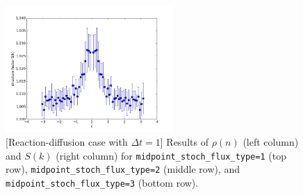 \documentclass{article}
\begin{document}
\begin{figure}
\includegraphics[width=0.5\linewidth,height=1.9in]{fig1/react_dt1_Sk_mid3.jpg}
\caption{\label{fig_react_dt1_mid_type}[Reaction-diffusion case with $\Delta t=1$] Results of $\rho(n)$ (left column) and $S(k)$ (right column) for \texttt{midpoint\_stoch\_flux\_type=1} (top row), \texttt{midpoint\_stoch\_flux\_type=2} (middle row), and \texttt{midpoint\_stoch\_flux\_type=3} (bottom row).
}
\end{figure}
\end{document}
